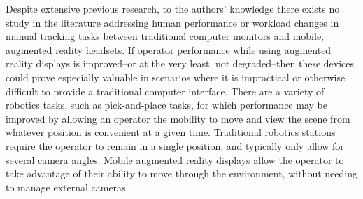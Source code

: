 Despite extensive previous research, to the authors' knowledge there exists no study in the literature addressing human performance or workload changes in manual tracking tasks between traditional computer monitors and mobile, augmented reality headsets.
If operator performance while using augmented reality displays is improved--or at the very least, not degraded--then these devices could prove especially valuable in scenarios where it is impractical or otherwise difficult to provide a traditional computer interface.
There are a variety of robotics tasks, such as pick-and-place tasks, for which performance may be improved by allowing an operator the mobility to move and view the scene from whatever position is convenient at a given time.
Traditional robotics stations require the operator to remain in a single position, and typically only allow for several camera angles.
Mobile augmented reality displays allow the operator to take advantage of their ability to move through the environment, without needing to manage external cameras.

